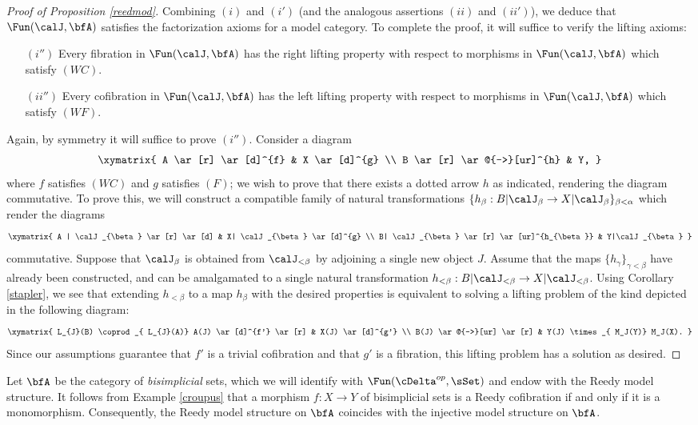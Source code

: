\begin{proof}[Proof of Proposition \ref{reedmod}]
Combining $(i)$ and $(i')$ (and the analogous assertions $(ii)$ and $(ii')$), we deduce that
$\Fun(\calJ, \bfA)$ satisfies the factorization axioms for a model category. To complete the proof, it will suffice to verify the lifting axioms:
\begin{itemize}
\item[$(i'')$] Every fibration in $\Fun(\calJ, \bfA)$ has the right lifting property with respect to
morphisms in $\Fun(\calJ, \bfA)$ which satisfy $(WC)$.
\item[$(ii'')$] Every cofibration in $\Fun(\calJ, \bfA)$ has the left lifting property with respect to morphisms in $\Fun(\calJ, \bfA)$ which satisfy $(WF)$.
\end{itemize}
Again, by symmetry it will suffice to prove $(i'')$. Consider a diagram
$$ \xymatrix{ A \ar[r] \ar[d]^{f} & X \ar[d]^{g} \\
B \ar[r] \ar@{-->}[ur]^{h} & Y, }$$
where $f$ satisfies $(WC)$ and $g$ satisfies $(F)$; we wish to prove that there
exists a dotted arrow $h$ as indicated, rendering the diagram commutative.
To prove this, we will construct a compatible family of natural transformations
$\{ h_{\beta}: B| \calJ_{\beta} \rightarrow X| \calJ_{\beta} \}_{ \beta < \alpha}$
which render the diagrams
$$ \xymatrix{ A | \calJ_{\beta} \ar[r] \ar[d] & X| \calJ_{\beta} \ar[d]^{g} \\
B| \calJ_{\beta} \ar[r] \ar[ur]^{h_{\beta}} & Y|\calJ_{\beta} }$$
commutative. Suppose that $\calJ_{\beta}$ is obtained from
$\calJ_{< \beta}$ by adjoining a single new object $J$. Assume that the maps
$\{ h_{\gamma} \}_{\gamma < \beta}$ have already been constructed, and can be amalgamated to a single natural transformation $h_{< \beta}: B | \calJ_{< \beta}
\rightarrow X| \calJ_{< \beta}$. Using Corollary \ref{stapler}, we see that extending
$h_{< \beta}$ to a map $h_{\beta}$ with the desired properties is equivalent to solving a lifting problem of the kind depicted in the following diagram:
$$ \xymatrix{ L_{J}(B) \coprod_{ L_{J}(A)} A(J) \ar[d]^{f'} \ar[r] & X(J) \ar[d]^{g'} \\
B(J) \ar@{-->}[ur] \ar[r] & Y(J) \times_{ M_J(Y)} M_J(X). }$$
Since our assumptions guarantee that $f'$ is a trivial cofibration and that $g'$ is a fibration, 
this lifting problem has a solution as desired.
\end{proof}

\begin{example}\label{tetsu}
Let $\bfA$ be the category of {\em bisimplicial} sets, which we will identify
with $\Fun( \cDelta^{op}, \sSet)$ and endow with the Reedy model structure.
It follows from Example \ref{croupus} that a morphism $f: X \rightarrow Y$ of bisimplicial sets is a Reedy cofibration if and only if it is a monomorphism. Consequently, the
Reedy model structure on $\bfA$ coincides with the injective model structure on $\bfA$.
\end{example}

